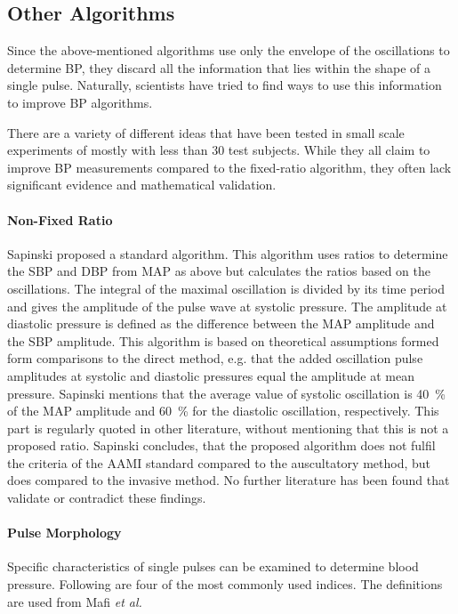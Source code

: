 \subsection{Other Algorithms}
Since the above-mentioned algorithms use only the envelope of the oscillations to determine BP, they discard all the information that lies within the shape of a single pulse. Naturally, scientists have tried to find ways to use this information to improve BP algorithms.

There are a variety of different ideas that have been tested in small scale experiments of mostly with less than 30 test subjects. While they all claim to improve BP measurements compared to the fixed-ratio algorithm, they often lack significant evidence and mathematical validation.


\paragraph{Non-Fixed Ratio}Sapinski \cite{Sapinski1996} proposed a standard algorithm. This algorithm uses ratios to determine the SBP and DBP from MAP as above but calculates the ratios based on the oscillations. The integral of the maximal oscillation is divided by its time period and gives the amplitude of the pulse wave at systolic pressure. The amplitude at diastolic pressure is defined as the difference between the MAP amplitude and the SBP amplitude. This algorithm is based on theoretical assumptions formed form comparisons to the direct method, e.g. that the added oscillation pulse amplitudes at systolic and diastolic pressures equal the amplitude at mean pressure. Sapinski mentions that the average value of systolic oscillation is \SI{40}{\%} of the MAP amplitude and \SI{60}{\%} for the diastolic oscillation, respectively. This part is regularly quoted in other literature, without mentioning that this is not a proposed ratio. Sapinski concludes, that the proposed algorithm does not fulfil the criteria of the AAMI standard compared to the auscultatory method, but does compared to the invasive method. No further literature has been found that validate or contradict these findings.


\paragraph{Pulse Morphology} Specific characteristics of single pulses can be examined to determine blood pressure. Following are four of the most commonly used indices. The definitions are used from Mafi \textit{et al.}\cite{Mafi2011}


